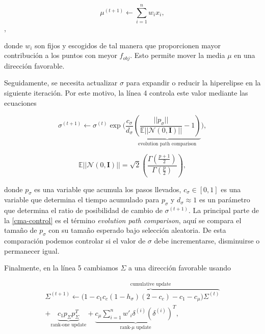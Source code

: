\begin{equation}
    \mu^{(t + 1)} \gets \sum_{i=1}^{n} w_i x_i,
\label{cma-average}
\end{equation},

donde $w_i$ son fijos y escogidos de tal manera que proporcionen mayor
contribución a los puntos con meyor $f_{obj}$. Esto permite mover la media $\mu$
en una dirección favorable.

Seguidamente, se necesita actualizar $\sigma$ para expandir o reducir la
hiperelipse en la siguiente iteración. Por este motivo, la línea 4 controla
este valor mediante las ecuaciones

\begin{equation}
    \sigma^{(t + 1)} \gets \sigma^{(t)} \exp\bigg(\frac{c_{\sigma}}{d_{\sigma}}
    \underbrace{\left(\frac{||p_{\sigma}||}{\mathbb{E}||\mathcal{N}(0,
    \mathbf{I})||} - 1 \right)}_{\text{evolution path comparison}} \bigg),
\label{cma-control}
\end{equation}

\begin{equation}
\mathbb{E}||\mathcal{N}(0, \mathbf{I})|| = \sqrt{2} \left(
  \frac{\Gamma\left(\frac{p + 1}{2}\right)}{\Gamma\left({\frac{p}{2}}\right)}
  \right),
\label{cma-E}
\end{equation}

donde $p_{\sigma}$ es una variable que acumula los pasos llevados,
$c_{\sigma} \in [0, 1]$ es una variable que determina el tiempo acumulado para $p_{\sigma}$ y 
$d_{\sigma} \approx 1$ es un parámetro que determina el ratio de posibilidad de cambio de $\sigma^{(t + 1)}$. 
La principal parte de la \autoref{cma-control} es el término \emph{evolution path comparison}, 
aquí se compara el tamaño de $p_{\sigma}$ con su tamaño esperado bajo selección
aleatoria.
De esta comparación podemos controlar si el valor de $\sigma$ debe
incrementarse, disminuirse o permanecer igual.

Finalmente, en la línea 5 cambiamos $\Sigma$ a una dirección favorable usando

\begin{multline}
    \Sigma^{(t + 1)} \gets \overbrace{\bigg(1 - c_1 c_c (1 - h_{\sigma})(2 - c_c) - c_1 - c_{\mu}\bigg) \Sigma^{(t)}}^{\text{cumulative update}} \\
    + \underbrace{c_{1} p_{\Sigma} p_{\Sigma}^{T}}_{\text{rank-one update}}
    + \underbrace{c_{\mu}\sum_{i=1}^{n}w'_{i}
    \delta^{(i)}\left(\delta^{(i)}\right)^{T}}_{\text{rank-}\mu\text{ update}},
\label{cma-adapt}
\end{multline}

